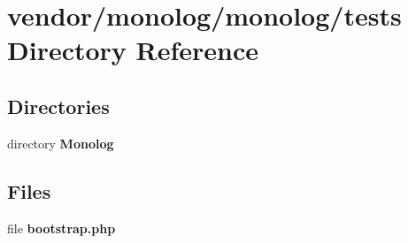 \section{vendor/monolog/monolog/tests Directory Reference}
\label{dir_ecc5cdcae762661703601f0d858594b1}
\subsection*{Directories}
\begin{DoxyCompactItemize}
\item 
directory {\bf Monolog}
\end{DoxyCompactItemize}
\subsection*{Files}
\begin{DoxyCompactItemize}
\item 
file {\bf bootstrap.\+php}
\end{DoxyCompactItemize}
